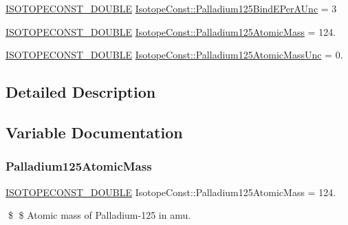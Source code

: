 \begin{DoxyCompactItemize}
\mbox{\hyperlink{group___isotope_const-_macros_ga8f45a7272ce02c0b4c65c44636ed719a}{I\+S\+O\+T\+O\+P\+E\+C\+O\+N\+S\+T\+\_\+\+D\+O\+U\+B\+LE}} \mbox{\hyperlink{group___isotope_const-_palladium-_pd125_gaa8b10cba3e709a45232ab31bf845c51d}{Isotope\+Const\+::\+Palladium125\+Bind\+E\+Per\+A\+Unc}} = 3
\item 
\mbox{\hyperlink{group___isotope_const-_macros_ga8f45a7272ce02c0b4c65c44636ed719a}{I\+S\+O\+T\+O\+P\+E\+C\+O\+N\+S\+T\+\_\+\+D\+O\+U\+B\+LE}} \mbox{\hyperlink{group___isotope_const-_palladium-_pd125_ga1ecbb00f1dcccbaf554cffb391ced317}{Isotope\+Const\+::\+Palladium125\+Atomic\+Mass}} = 124.
\item 
\mbox{\hyperlink{group___isotope_const-_macros_ga8f45a7272ce02c0b4c65c44636ed719a}{I\+S\+O\+T\+O\+P\+E\+C\+O\+N\+S\+T\+\_\+\+D\+O\+U\+B\+LE}} \mbox{\hyperlink{group___isotope_const-_palladium-_pd125_ga2c947b71977adabe5459865c56bc6d8f}{Isotope\+Const\+::\+Palladium125\+Atomic\+Mass\+Unc}} = 0.
\end{DoxyCompactItemize}


\subsection{Detailed Description}


\subsection{Variable Documentation}
\mbox{\label{group___isotope_const-_palladium-_pd125_ga1ecbb00f1dcccbaf554cffb391ced317}} 
\subsubsection{\texorpdfstring{Palladium125\+Atomic\+Mass}{Palladium125AtomicMass}}
{\footnotesize\ttfamily \mbox{\hyperlink{group___isotope_const-_macros_ga8f45a7272ce02c0b4c65c44636ed719a}{I\+S\+O\+T\+O\+P\+E\+C\+O\+N\+S\+T\+\_\+\+D\+O\+U\+B\+LE}} Isotope\+Const\+::\+Palladium125\+Atomic\+Mass = 124.}

\$ \$ Atomic mass of Palladium-\/125 in amu. \mbox{\label{group___isotope_const-_palladium-_pd125_ga2c947b71977adabe5459865c56bc6d8f}} 
